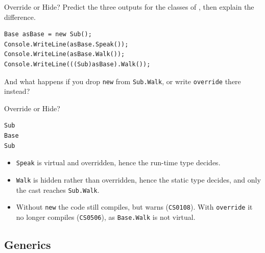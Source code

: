 \begin{exerciseframe}{Override or Hide?}
  Predict the three outputs for the classes of , then
  explain the difference.
  \vspace{1ex}

  \begin{lstlisting}[basicstyle=\scriptsize\ttfamily]
Base asBase = new Sub();
Console.WriteLine(asBase.Speak());
Console.WriteLine(asBase.Walk());
Console.WriteLine(((Sub)asBase).Walk());
  \end{lstlisting}
  \vspace{1ex}

  And what happens if you drop \texttt{new} from \texttt{Sub.Walk}, or write
  \texttt{override} there instead?
\end{exerciseframe}

\begin{solutionframe}{Override or Hide?}
  \begin{lstlisting}[language={},basicstyle=\scriptsize\ttfamily]
Sub
Base
Sub
  \end{lstlisting}
  \begin{itemize}
    \item \texttt{Speak} is virtual and overridden, hence the run-time type
      decides.
    \item \texttt{Walk} is hidden rather than overridden, hence the static type
      decides, and only the cast reaches \texttt{Sub.Walk}.
    \item Without \texttt{new} the code still compiles, but warns
      (\texttt{CS0108}). With \texttt{override} it no longer compiles
      (\texttt{CS0506}), as \texttt{Base.Walk} is not virtual.
  \end{itemize}
  \vspace{4ex}

\end{solutionframe}

\subsection{Generics}

